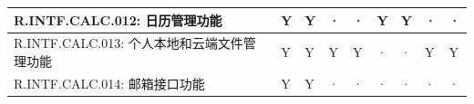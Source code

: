 \begin{table}[htbp]
\begin{tabular}{|p{9em}|p{2.5em}|p{2.5em}|p{2.5em}|p{2.5em}|p{2.5em}|
                            p{2.5em}|p{2.5em}|p{2.5em}|}
            R.INTF.CALC.012: 日历管理功能
                & Y                     & Y                 & · 
                & ·                     & Y                 & Y 
                & ·                     & ·                 \\
            \hline %
            R.INTF.CALC.013: 个人本地和云端文件管理功能
                & Y                     & Y                 & Y 
                & Y                     & ·                 & · 
                & Y                     & Y                 \\
            \hline %
            R.INTF.CALC.014: 邮箱接口功能
                & Y                     & Y                 & · 
                & ·                     & ·                 & · 
                & ·                     & ·                 \\
            \hline %
            \end{tabular}
    \end{table}
